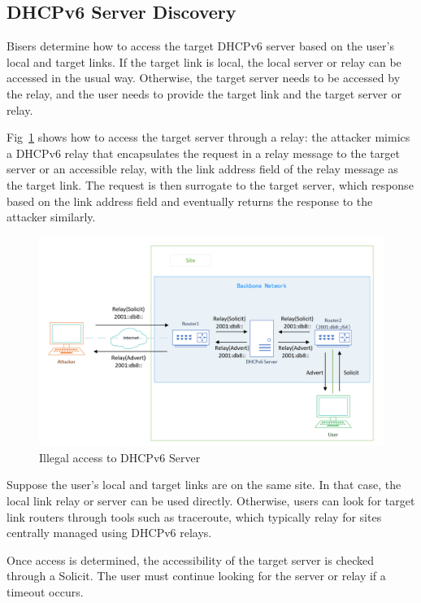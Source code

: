\documentclass[conference]{IEEEtran}
\begin{document}
\subsection{DHCPv6 Server Discovery}

Bisers determine how to access the target DHCPv6 server based on the
user's local and target links. If the target link is local, the local
server or relay can be accessed in the usual way. Otherwise, the
target server needs to be accessed by the relay, and the user needs to
provide the target link and the target server or relay.

Fig~\ref{figRelay2} shows how to access the target server through a
relay: the attacker mimics a DHCPv6 relay that encapsulates the
request in a relay message to the target server or an accessible
relay, with the link address field of the relay message as the target
link. The request is then surrogate to the target server, which
response based on the link address field and eventually returns the
response to the attacker similarly.

\begin{figure}[htbp]
  \centerline{\includegraphics[scale=0.4]{relay2.png}}
  \caption{Illegal access to DHCPv6 Server}
  \label{figRelay2}
\end{figure}

Suppose the user's local and target links are on the same site. In
that case, the local link relay or server can be used
directly. Otherwise, users can look for target link routers through
tools such as traceroute, which typically relay for sites centrally
managed using DHCPv6 relays.

Once access is determined, the accessibility of the target server is
checked through a Solicit. The user must continue looking for the
server or relay if a timeout occurs.
\end{document}
